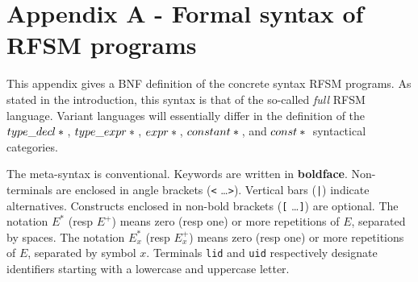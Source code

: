 \chapter*{Appendix A - Formal syntax of RFSM programs}
\label{cha:bnf}

This appendix gives a BNF definition of the concrete syntax RFSM programs.
As stated in the introduction, this syntax is that of the so-called \emph{full} RFSM language.
Variant languages will essentially differ in the definition of the
$type\_decl*{}$,
$type\_expr*{}$,
$expr*{}$,
$constant*{}$,
and $const*{}$
syntactical categories.

\medskip
The meta-syntax is conventional. Keywords are written in \textbf{boldface}.  Non-terminals are
enclosed in angle brackets ({\tt <} \ldots {\tt >}).  Vertical bars ({\tt |}) indicate
alternatives.  Constructs enclosed in non-bold brackets ({\tt [} \ldots {\tt ]}) are optional.
The notation $E^*$ (resp $E^+$) means zero (resp one) or more repetitions of $E$, separated by spaces.
The notation $E^*_x$ (resp $E^+_x$) means zero (resp one) or more repetitions of $E$, separated by
symbol $x$. Terminals \verb|lid| and \verb|uid| respectively designate identifiers
starting with a lowercase and uppercase letter. 



